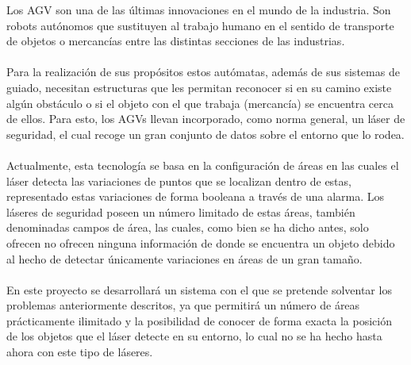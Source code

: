 
Los AGV \cite{AGVdes} son una de las últimas innovaciones en el mundo de la industria. Son robots autónomos que sustituyen al trabajo humano en el sentido de transporte de objetos o mercancías entre las distintas secciones de las industrias. \\
\\
Para la realización de sus propósitos estos autómatas, además de sus sistemas de guiado, necesitan estructuras que les permitan reconocer si en su camino existe algún obstáculo o si el objeto con el que trabaja (mercancía) se encuentra cerca de ellos. Para esto, los AGVs llevan incorporado, como norma general, un láser de seguridad, el cual recoge un gran conjunto de datos sobre el entorno que lo rodea.\\
\\
Actualmente, esta tecnología se basa en la configuración de áreas en las cuales el láser detecta las variaciones de puntos que se localizan dentro de estas, representado estas variaciones de forma booleana a través de una alarma. Los láseres de seguridad poseen un número limitado de estas áreas, también denominadas campos de área, las cuales, como bien se ha dicho antes, solo ofrecen no ofrecen ninguna información de donde se encuentra un objeto debido al hecho de detectar únicamente variaciones en áreas de un gran tamaño.\\
\\
En este proyecto se desarrollará un sistema con el que se pretende solventar los problemas anteriormente descritos, ya que permitirá un número de áreas prácticamente ilimitado y la posibilidad de conocer de forma exacta la posición de los objetos que el láser detecte en su entorno, lo cual no se ha hecho hasta ahora con este tipo de láseres.\\
\\
